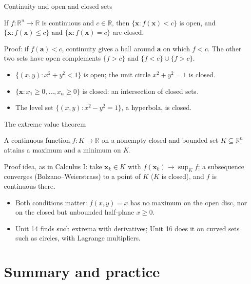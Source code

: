 \documentclass[10pt]{wosm-slides}
\newcommand{\R}{\mathbb{R}}
\newcommand{\vx}{\mathbf{x}}
\newcommand{\va}{\mathbf{a}}
\begin{document}
\begin{frame}{Continuity and open and closed sets}
  \begin{theorem}
    If $f\colon \R^n \to \R$ is continuous and $c \in \R$, then
    $\{\vx : f(\vx) < c\}$ is open, and $\{\vx : f(\vx) \le c\}$ and $\{\vx : f(\vx) = c\}$ are closed.
  \end{theorem}
  {\small Proof: if $f(\va) < c$, continuity gives a ball around $\va$ on which $f < c$. The other
  two sets have open complements $\{f > c\}$ and $\{f < c\} \cup \{f > c\}$.\par}
  \pause
  \begin{example}
    \begin{itemize}
      \item $\{(x, y) : x^2 + y^2 < 1\}$ is open; the unit circle $x^2 + y^2 = 1$ is closed.
      \item $\{\vx : x_1 \ge 0, \dots, x_n \ge 0\}$ is closed: an intersection of closed sets.
      \item The level set $\{(x, y) : x^2 - y^2 = 1\}$, a hyperbola, is closed.
    \end{itemize}
  \end{example}
\end{frame}

\begin{frame}{The extreme value theorem}
  \begin{theorem}
    A continuous function $f\colon K \to \R$ on a nonempty closed and bounded set $K \subseteq \R^n$
    attains a maximum and a minimum on $K$.
  \end{theorem}
  {\small Proof idea, as in Calculus I: take $\vx_k \in K$ with $f(\vx_k) \to \sup_K f$; a subsequence
  converges (Bolzano--Weierstrass) to a point of $K$ ($K$ is closed), and $f$ is continuous there.\par}
  \pause
  \begin{itemize}
    \item Both conditions matter: $f(x, y) = x$ has no maximum on the open disc, nor on the
      closed but unbounded half-plane $x \ge 0$.
    \item Unit 14 finds such extrema with derivatives; Unit 16 does it on curved sets such as
      circles, with Lagrange multipliers.
  \end{itemize}
\end{frame}

\section{Summary and practice}
\end{document}
